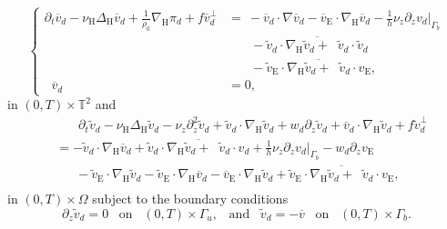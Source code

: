 \documentclass[preprint]{elsarticle}
\numberwithin{equation}{section}
\newcommand {\T}	{\mathbb{T}}
\DeclareMathOperator{\divH}{div_{\H}}
\renewcommand{\H}{\mathrm{H}}
\renewcommand{\bar}[1]{\overline{#1}}
\newcommand{\vbar}{\bar{v}}
\newcommand{\vtilde}{\tilde{v}}
\newcommand{\nablaH}{\nabla_{\H}}
\newcommand{\DeltaH}{\Delta_{\H}}
\newcommand{\rH}{\H}
\newcommand{\rE}{\mathrm{E}}
\begin{document}
\begin{equation}
	\label{eq:difference_2 bar}
	\left\{
	\begin{aligned}
		\partial_t \vbar_d - \nu_{\rH} \DeltaH \vbar_d + \frac{1}{\rho_0}\nablaH \pi_d + f \vbar_d^\perp
		&=
		\ - \vbar_d \cdot \nabla \vbar_d - \vbar_{\rE} \cdot \nablaH \vbar_d
		-\frac{1}{h} \nu_z \partial_z v_d\big|_{\Gamma_b} \\ %
		&\phantom{ = } \ \ - \overline{\vtilde_d \cdot \nablaH \vtilde_d + \divH \vtilde_d \cdot \vtilde_d} \\ %
		&\phantom{ = } \ \ 
		- \overline{\vtilde_{\rE} \cdot \nablaH \vtilde_d + \divH \tilde{v}_d \cdot v_{\rE}}, %
		\\
		\divH \vbar_d &= 0, %
	\end{aligned}
	\right.
\end{equation}
in $(0,T) \times \T^2$ and 
\begin{equation}
	\label{eq:difference_2 tilde} 
	\begin{aligned}
		&\phantom{ = } \ \ \partial_t \vtilde_d - \nu_{\rH} \DeltaH \vtilde_d - \nu_z \partial_z^2 \vtilde_d + \vtilde_d \cdot \nablaH \vtilde_d + w_d \partial_z \vtilde_d +\vbar_d \cdot \nablaH \vtilde_d + f \vtilde_d^\perp \\
		&= - \vtilde_d \cdot \nablaH \vbar_d
		+ \overline{\vtilde_d \cdot \nablaH \vtilde_d + \divH \tilde{v}_d \cdot v_d}
		+ \frac{1}{h} \nu_z \partial_z v_d\big|_{\Gamma_b} - w_d \partial_z v_{\rE} \\
		&\phantom{ = } \
		- \vtilde_{\rE} \cdot \nablaH \vtilde_d
		- \vtilde_{\rE} \cdot \nablaH \vbar_d
		- \vbar_{\rE} \cdot \nablaH \vtilde_d 
		+ \overline{\vtilde_{\rE} \cdot \nablaH \vtilde_d + \divH \tilde{v}_d \cdot v_{\rE}}, \\
	\end{aligned}
\end{equation}
in $(0,T) \times \Omega$
subject to the boundary conditions
\begin{equation*}
	\partial_z \vtilde_d = 0 \enspace \text{ on } \enspace (0,T) \times \Gamma_u, \enspace \text{ and } \enspace
	\vtilde_d = -\vbar \enspace \text{ on } \enspace (0,T) \times \Gamma_b.
\end{equation*}
\end{document}
